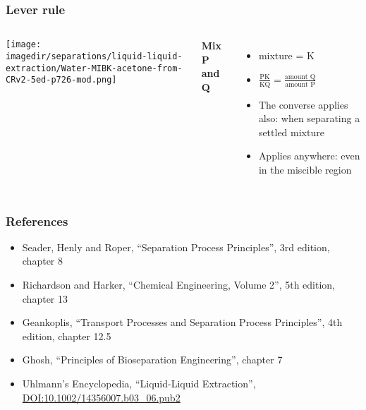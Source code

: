 \begin{frame}\frametitle{Lever rule}
	\begin{columns}[t]
			\begin{center}
				\texttt{[image: \\imagedir/separations/liquid-liquid-extraction/Water-MIBK-acetone-from-CRv2-5ed-p726-mod.png]}
			\end{center}
			\textbf{Mix P and Q}
			
			\begin{itemize}
				\item	mixture = K
				\vspace{12pt}
				\item	$\displaystyle \frac{\text{PK}}{\text{KQ}} = \displaystyle\frac{\text{amount Q}}{\text{amount P}}$
				\vspace{12pt}
				\item	The converse applies also: when separating a settled mixture
				\item	Applies anywhere: even in the miscible region
			\end{itemize}
	\end{columns}
\end{frame}

\begin{frame}\frametitle{References}
	\begin{itemize}
		\item	Seader, Henly and Roper, ``Separation Process Principles'', 3rd edition, chapter 8
		\item	Richardson and Harker, ``Chemical Engineering, Volume 2'', 5th edition, chapter 13
		\item	Geankoplis, ``Transport Processes and Separation Process Principles'', 4th edition, chapter 12.5
		\item	Ghosh, ``Principles of Bioseparation Engineering'', chapter 7
		\item	Uhlmann's Encyclopedia, ``Liquid-Liquid Extraction'',  \href{http://dx.doi.org/10.1002/14356007.b03\_06.pub2}{DOI:10.1002/14356007.b03\_06.pub2}
	\end{itemize}
\end{frame}

